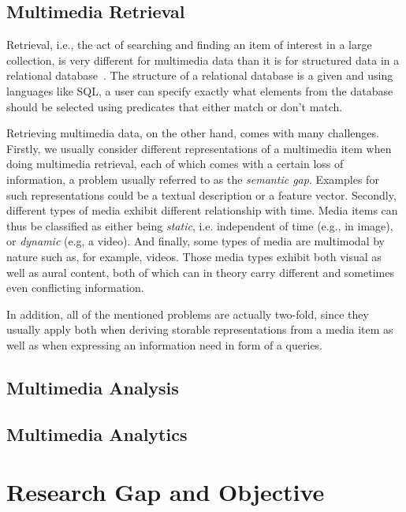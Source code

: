 \subsection{Multimedia Retrieval}

Retrieval, i.e., the act of searching and finding an item of interest in a large collection, is very different for multimedia data than it is for structured data in a relational database~\cite{Blanken:2007multimedia}. The structure of a relational database is a given and using languages like SQL, a user can specify exactly what elements from the database should be selected using predicates that either match or don't match.

Retrieving multimedia data, on the other hand, comes with many challenges. Firstly, we usually consider different representations of a multimedia item when doing multimedia retrieval, each of which comes with a certain loss of information, a problem usually referred to as the \emph{semantic gap}. Examples for such representations could be a textual description or a feature vector. Secondly, different types of media exhibit different relationship with time. Media items can thus be classified as either being \emph{static}, i.e. independent of time (e.g., in image), or \emph{dynamic} (e.g, a video). And finally, some types of media are multimodal by nature such as, for example, videos. Those media types exhibit both visual as well as aural content, both of which can in theory carry different and sometimes even conflicting information.

In addition, all of the mentioned problems are actually two-fold, since they usually apply  both when deriving storable representations from a media item as well as when expressing an information need in form of a queries.

\subsection{Multimedia Analysis}

\subsection{Multimedia Analytics}


\section{Research Gap and Objective}

